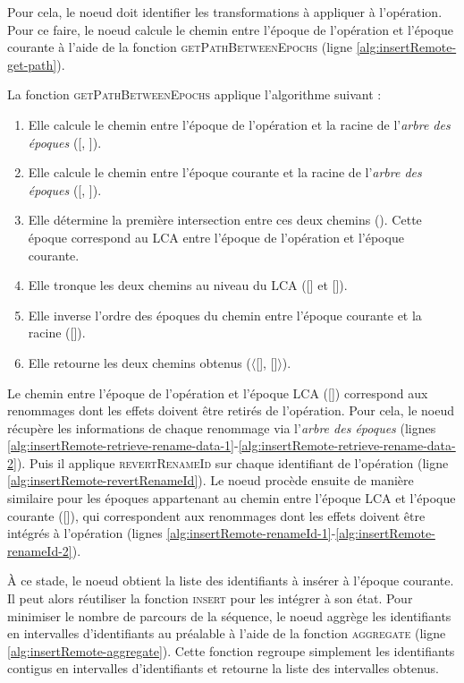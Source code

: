 Pour cela, le noeud doit identifier les transformations à appliquer à l'opération.
Pour ce faire, le noeud calcule le chemin entre l'époque de l'opération et l'époque courante à l'aide de la fonction \textsc{getPathBetweenEpochs} (ligne \ref{alg:insertRemote-get-path}).

La fonction \textsc{getPathBetweenEpochs} applique l'algorithme suivant :
\begin{enumerate}
  \item Elle calcule le chemin entre l'époque de l'opération et la racine de l'\emph{arbre des époques} ([, ]).
  \item Elle calcule le chemin entre l'époque courante et la racine de l'\emph{arbre des époques} ([, ]).
  \item Elle détermine la première intersection entre ces deux chemins ().
    Cette époque correspond au \acf{LCA} entre l'époque de l'opération et l'époque courante.
  \item Elle tronque les deux chemins au niveau du \ac{LCA} ([] et []).
  \item Elle inverse l'ordre des époques du chemin entre l'époque courante et la racine ([]).
  \item Elle retourne les deux chemins obtenus ($\langle$[], []$\rangle$).
\end{enumerate}

Le chemin entre l'époque de l'opération et l'époque \ac{LCA} ([]) correspond aux renommages dont les effets doivent être retirés de l'opération.
Pour cela, le noeud récupère les informations de chaque renommage via l'\emph{arbre des époques} (lignes \ref{alg:insertRemote-retrieve-rename-data-1}-\ref{alg:insertRemote-retrieve-rename-data-2}).
Puis il applique \textsc{revertRenameId} sur chaque identifiant de l'opération (ligne \ref{alg:insertRemote-revertRenameId}).
Le noeud procède ensuite de manière similaire pour les époques appartenant au chemin entre l'époque \ac{LCA} et l'époque courante ([]), qui correspondent aux renommages dont les effets doivent être intégrés à l'opération (lignes \ref{alg:insertRemote-renameId-1}-\ref{alg:insertRemote-renameId-2}).

À ce stade, le noeud obtient la liste des identifiants à insérer à l'époque courante.
Il peut alors réutiliser la fonction \textsc{insert} pour les intégrer à son état.
Pour minimiser le nombre de parcours de la séquence, le noeud aggrège les identifiants en intervalles d'identifiants au préalable à l'aide de la fonction \textsc{aggregate} (ligne \ref{alg:insertRemote-aggregate}).
Cette fonction regroupe simplement les identifiants contigus en intervalles d'identifiants et retourne la liste des intervalles obtenus.

